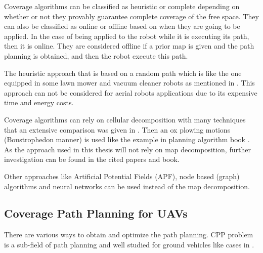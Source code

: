 Coverage algorithms can be classified as heuristic or complete depending on whether or not they provably guarantee complete coverage of the free space. They can also be classified as online or offline based on when they are going to be applied. In the case of being applied to the robot while it is executing its path, then it is online. They are considered offline if a prior map is given and the path planning is obtained, and then the robot execute this path.
 
The heuristic approach that is based on a random path which is like the one equipped in some lawn mower and vacuum cleaner robots as mentioned in \cite{CPP1}. This approach can not be considered for aerial robots applications due to its expensive time and energy costs.

Coverage algorithms can rely on cellular decomposition with many techniques that an extensive comparison was given in \cite{CPP2}. Then an ox plowing motions (Boustrophedon manner) is used like the example in planning algorithm book \cite{planningBook}. As the approach used in this thesis will not rely on map decomposition, further investigation can be found in the cited papers and book.




Other approaches like  Artificial Potential Fields (APF), node based (graph) algorithms and neural networks can be used instead of the map decomposition. %




\subsection{Coverage Path Planning for UAVs}
There are various ways to obtain and optimize the path planning. CPP problem is a sub-field of path planning and well studied for ground vehicles like cases in \cite{CPP1,CPP2,path_planning_UGV}.

